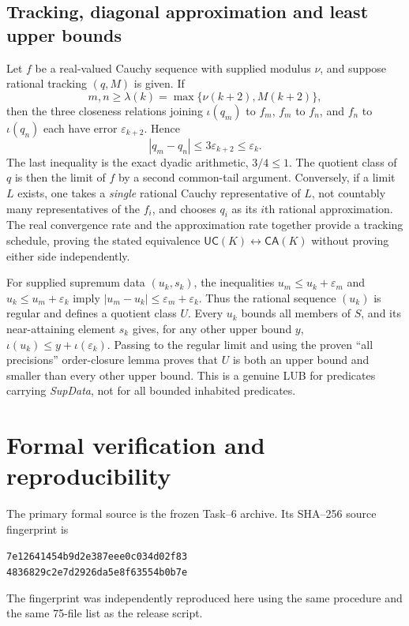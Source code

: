 \documentclass[11pt,reqno]{amsart}
\theoremstyle{definition}\newtheorem{definition}[theorem]{Definition}
\theoremstyle{remark}\newtheorem{remark}[theorem]{Remark}
\newcommand{\eps}{\varepsilon}
\begin{document}
\subsection{Tracking, diagonal approximation and least upper bounds}
Let $f$ be a real-valued Cauchy sequence with supplied modulus $\nu$, and suppose rational tracking $(q,M)$ is given. If
\[
 m,n\ge\lambda(k)=\max\{\nu(k+2),M(k+2)\},
\]
then the three closeness relations joining $\iota(q_m)$ to $f_m$, $f_m$ to $f_n$, and $f_n$ to $\iota(q_n)$ each have error $\eps_{k+2}$. Hence
\[
 |q_m-q_n|\le3\eps_{k+2}\le\eps_k.
\]
The last inequality is the exact dyadic arithmetic, $3/4\le1$. The quotient class of $q$ is then the limit of $f$ by a second common-tail argument. Conversely, if a limit $L$ exists, one takes a \emph{single} rational Cauchy representative of $L$, not countably many representatives of the $f_i$, and chooses $q_i$ as its $i$th rational approximation. The real convergence rate and the approximation rate together provide a tracking schedule, proving the stated equivalence $\mathsf{UC}(K)\leftrightarrow\mathsf{CA}(K)$ without proving either side independently.

For supplied supremum data $(u_k,s_k)$, the inequalities $u_m\le u_k+\eps_m$ and $u_k\le u_m+\eps_k$ imply $|u_m-u_k|\le\eps_m+\eps_k$. Thus the rational sequence $(u_k)$ is regular and defines a quotient class $U$. Every $u_k$ bounds all members of $S$, and its near-attaining element $s_k$ gives, for any other upper bound $y$, $\iota(u_k)\le y+\iota(\eps_k)$. Passing to the regular limit and using the proven ``all precisions'' order-closure lemma proves that $U$ is both an upper bound and smaller than every other upper bound. This is a genuine LUB for predicates carrying \emph{SupData}, not for all bounded inhabited predicates.



\clearpage
\section{Formal verification and reproducibility}\label{app:verification}
The primary formal source is the frozen Task--6 archive. Its SHA--256 source fingerprint is

\begin{center}\footnotesize\texttt{7e12641454b9d2e387eee0c034d02f83}\\\texttt{4836829c2e7d2926da5e8f63554b0b7e}\end{center}
The fingerprint was independently reproduced here using the same procedure and the same 75-file list as the release script.
\end{document}
